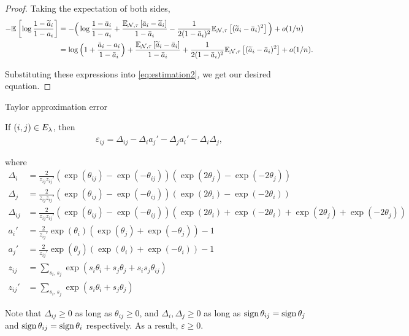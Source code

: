 \begin{proof}
Taking the expectation of both sides,
\begin{align*}
-\mathbb{E}_{}\left[\log \frac{1 - \widetilde{a}_i}{1 - a_i}\right] &= -\Big(\log \frac{1 - \bar{a}_i}{1 - a_i} + \frac{\mathbb{E}_{\mathcal{N}, \tau}\left[\bar{a}_i - \widetilde{a}_i\right]}{1 - \bar{a}_i} - \frac{1}{2(1 - \bar{a}_i)^2} \mathbb{E}_{\mathcal{N}, \tau}\left[(\widetilde{a}_i - \bar{a}_i)^2\right]\Big) + o(1/n) \\
&= \log \Big(1 +  \frac{\bar{a}_i - a_i}{1 - \bar{a}_i}\Big) + \frac{\mathbb{E}_{\mathcal{N}, \tau}\left[\widetilde{a}_i - \bar{a}_i\right]}{1 - \bar{a}_i} + \frac{1}{2(1 - \bar{a}_i)^2} \mathbb{E}_{\mathcal{N}, \tau}\left[(\widetilde{a}_i - \bar{a}_i)^2\right] + o(1/n).
\end{align*}

Substituting these expressions into \eqref{eq:estimation2}, we get our desired equation.

\end{proof}


Taylor approximation error 

\begin{lemma}
If $(i, j) \in E_{\lambda}$, then
\begin{align}
    \varepsilon_{ij} = \Delta_{ij} - \Delta_i a_j' - \Delta_j a_i' - \Delta_i \Delta_j,
\end{align}

where
\begin{align}
    \Delta_i &= \frac{2}{z_{ij} z_{ij}'} (\exp(\theta_{ij}) - \exp(-\theta_{ij})) (\exp(2\theta_j) - \exp(-2\theta_j)) \\
    \Delta_j &= \frac{2}{z_{ij} z_{ij}'} (\exp(\theta_{ij}) - \exp(-\theta_{ij})) (\exp(2\theta_i) - \exp(-2\theta_i)) \\
    \Delta_{ij} &= \frac{2}{z_{ij} z_{ij}'} (\exp(\theta_{ij}) - \exp(-\theta_{ij})) (\exp(2\theta_i) + \exp(-2\theta_i) + \exp(2\theta_j) + \exp(-2\theta_j)) \\
    a_i' &= \frac{2}{z_{ij}'} \exp(\theta_i) (\exp(\theta_j) + \exp(-\theta_j)) - 1 \\
    a_j' &= \frac{2}{z_{ij}'} \exp(\theta_j) (\exp(\theta_i) + \exp(-\theta_i)) - 1 \\
    z_{ij} &= \sum_{{s_i, s_j}} \exp(s_i \theta_i + s_j \theta_j + s_i s_j \theta_{ij}) \\
    z_{ij}' &=  \sum_{{s_i, s_j}} \exp(s_i \theta_i + s_j \theta_j)
\end{align}


Note that $\Delta_{ij} \ge 0$ as long as $\theta_{ij} \ge 0$, and $\Delta_i, \Delta_j \ge 0$ as long as $\operatorname{sign}{\theta_{ij}} = \operatorname{sign}{\theta_j}$ and $\operatorname{sign}{\theta_{ij}} = \operatorname{sign}{\theta_i}$ respectively. As a result, $\varepsilon \ge 0$.

\label{lemma:varepsilon}

\end{lemma}


